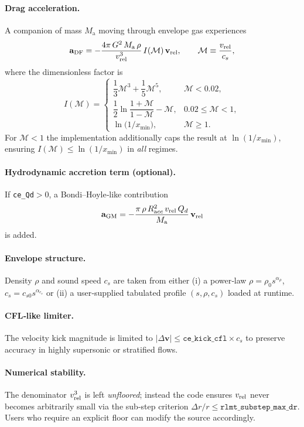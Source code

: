 \documentclass[11pt]{article}
\begin{document}
\paragraph{Drag acceleration.}
A companion of mass $M_{\mathrm a}$ moving through envelope gas experiences
\[
\mathbf a_{\rm DF}=
-\frac{4\pi\,G^2\,M_{\mathrm a}\,\rho}{v_{\rm rel}^3}\,
   I(\mathcal M)\,\mathbf v_{\rm rel},
\qquad
\mathcal M\equiv\frac{v_{\rm rel}}{c_s},
\]
where the dimensionless factor is
\begin{equation}
I(\mathcal M)=
\begin{cases}
\dfrac{1}{3}\mathcal M^3+\dfrac{1}{5}\mathcal M^5,&\mathcal M<0.02,\\[0.6em]
\dfrac{1}{2}\ln\!\dfrac{1+\mathcal M}{1-\mathcal M}-\mathcal M,
 & 0.02\le\mathcal M<1,\\[0.6em]
\ln\!\bigl(1/x_{\min}\bigr),&\mathcal M\ge1.
\end{cases}
\label{eq:I_prefactor}
\end{equation}
For $\mathcal M<1$ the implementation additionally caps the result at
$\ln(1/x_{\min})$,
ensuring $I(\mathcal M)\le\ln(1/x_{\min})$ in \emph{all} regimes.

\paragraph{Hydrodynamic accretion term (optional).}
If \texttt{ce\_Qd}$>$0,
a Bondi–Hoyle‐like contribution
\[
\mathbf a_{\rm GM}
=-\frac{\pi\,\rho\,R_{\mathrm acc}^2\,v_{\rm rel}\,Q_d}{M_{\mathrm a}}
\,\mathbf v_{\rm rel}
\]
is added.

\paragraph{Envelope structure.}
Density $\rho$ and sound speed $c_s$ are taken from either  
(i) a power‑law $\rho=\rho_0s^{\alpha_\rho}$, $c_s=c_{s0}s^{\alpha_{c_s}}$
or  
(ii) a user‑supplied tabulated profile $(s,\rho,c_s)$ loaded at runtime.

\paragraph{CFL‑like limiter.}
The velocity kick magnitude is limited to
$|\Delta\mathbf v|\le\texttt{ce\_kick\_cfl}\times c_s$ to preserve accuracy
in highly supersonic or stratified flows.

\paragraph{Numerical stability.}
The denominator $v_{\rm rel}^3$ is left \emph{unfloored}; instead the code
ensures $v_{\rm rel}$ never becomes arbitrarily small via the
sub‑step criterion $\Delta r/r\le\texttt{rlmt\_substep\_max\_dr}$.
Users who require an explicit floor can modify the source accordingly.
\end{document}
